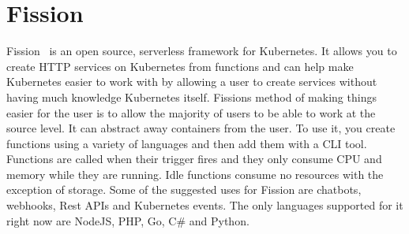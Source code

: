 \section{Fission}
Fission~\cite{hid-sp18-521-FissionBlog} is an open source, serverless
framework for Kubernetes. It allows you to create HTTP services
on Kubernetes from functions and can help make Kubernetes easier
to work with by allowing a user to create services without having
much knowledge Kubernetes itself. Fissions method of making things easier
for the user is to allow the majority of users to be able to work at the
source level. It can abstract away containers from the user. To use 
it, you create functions using a variety of languages and then add them
with a CLI tool. Functions are called when their trigger fires and they
only consume CPU and memory while they are running. Idle functions
consume no resources with the exception of storage. Some of the 
suggested uses for Fission are chatbots, webhooks, Rest APIs and 
Kubernetes events. The only languages supported for it right now
are NodeJS, PHP, Go, C# and Python.
